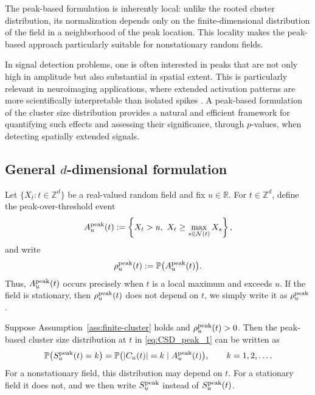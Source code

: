 \documentclass[aap,preprint]{imsart}
\theoremstyle{plain}
\theoremstyle{definition}
\def\R{{\mathbb R}}
\def\P{{\mathbb P}}
\def\Z{{\mathbb Z}}
\begin{document}
	The peak-based formulation is inherently local: unlike the rooted cluster distribution, its normalization depends only on the finite-dimensional distribution of the field in a neighborhood of the peak location. This locality makes the peak-based approach particularly suitable for nonstationary random fields.
	
	In signal detection problems, one is often interested in peaks that are not only high in amplitude but also substantial in spatial extent. This is particularly relevant in neuroimaging applications, where extended activation patterns are more scientifically interpretable than isolated spikes \cite{Chumbley:2010,Poline:1997,Worsley:1996a,Zhang:2009}. A peak-based formulation of the cluster size distribution provides a natural and efficient framework for quantifying such effects and assessing their significance, through $p$-values, when detecting spatially extended signals.
	
	
	\subsection{General $d$-dimensional formulation}
	Let $\{X_t:t\in\Z^d\}$ be a real-valued random field and fix $u\in\R$. For $t\in\Z^d$, define the peak-over-threshold event
	\begin{equation}\label{eq:peak-event}
		A_u^{\rm peak}(t)
		:=
		\left\{X_t>u,\
		X_t\ge \max_{s\in\mathcal N(t)}X_s\right\},
	\end{equation}
	and write
	\begin{equation}\label{eq:peak-intensity-local}
		\rho_u^{\rm peak}(t):=\P\bigl(A_u^{\rm peak}(t)\bigr).
	\end{equation}
	Thus, $A_u^{\rm peak}(t)$ occurs precisely when $t$ is a local maximum
	and exceeds $u$. If the field is stationary, then $\rho_u^{\rm peak}(t)$ does not depend on $t$, we simply write it as $\rho_u^{\rm peak}$.
	
	Suppose Assumption~\ref{ass:finite-cluster} holds and
	$\rho_u^{\rm peak}(t)>0$.  Then the peak-based cluster size distribution
		at $t$ in \eqref{eq:CSD_peak_1} can be written as
	\begin{equation}\label{eq:CSD_peak}
		\P\bigl(S_u^{\rm peak}(t)=k\bigr) =
		\P\bigl(|C_u(t)|=k\mid A_u^{\rm peak}(t)\bigr),
		\qquad k=1,2,\ldots.
	\end{equation}
	For a nonstationary field, this distribution may depend on $t$.  For a
	stationary field it does not, and we then write $S_u^{\rm peak}$ instead of
	$S_u^{\rm peak}(t)$.
	
\end{document}
